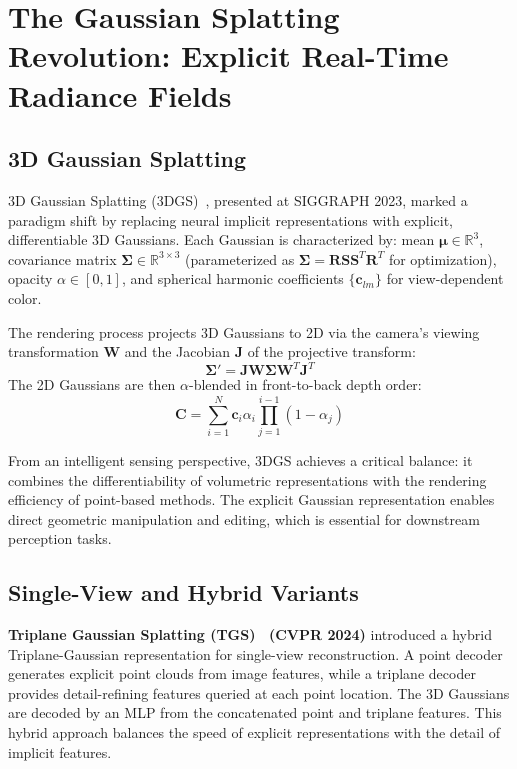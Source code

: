 \documentclass[journal]{IEEEtran}
\begin{document}
\section{The Gaussian Splatting Revolution: Explicit Real-Time Radiance Fields}
\label{sec:3dgs}

\subsection{3D Gaussian Splatting}

3D Gaussian Splatting (3DGS)~\cite{3dgs}, presented at SIGGRAPH 2023, marked a paradigm shift by replacing neural implicit representations with explicit, differentiable 3D Gaussians. Each Gaussian is characterized by: mean $\boldsymbol{\mu} \in \mathbb{R}^3$, covariance matrix $\boldsymbol{\Sigma} \in \mathbb{R}^{3\times 3}$ (parameterized as $\boldsymbol{\Sigma} = \mathbf{R}\mathbf{S}\mathbf{S}^T\mathbf{R}^T$ for optimization), opacity $\alpha \in [0,1]$, and spherical harmonic coefficients $\{\mathbf{c}_{lm}\}$ for view-dependent color.

The rendering process projects 3D Gaussians to 2D via the camera's viewing transformation $\mathbf{W}$ and the Jacobian $\mathbf{J}$ of the projective transform:
\begin{equation}
\boldsymbol{\Sigma}' = \mathbf{J}\mathbf{W}\boldsymbol{\Sigma}\mathbf{W}^T\mathbf{J}^T
\end{equation}
The 2D Gaussians are then $\alpha$-blended in front-to-back depth order:
\begin{equation}
\mathbf{C} = \sum_{i=1}^N \mathbf{c}_i \alpha_i \prod_{j=1}^{i-1} (1 - \alpha_j)
\end{equation}

From an intelligent sensing perspective, 3DGS achieves a critical balance: it combines the differentiability of volumetric representations with the rendering efficiency of point-based methods. The explicit Gaussian representation enables direct geometric manipulation and editing, which is essential for downstream perception tasks.

\subsection{Single-View and Hybrid Variants}

\textbf{Triplane Gaussian Splatting (TGS)~\cite{tgs} (CVPR 2024)} introduced a hybrid Triplane-Gaussian representation for single-view reconstruction. A point decoder generates explicit point clouds from image features, while a triplane decoder provides detail-refining features queried at each point location. The 3D Gaussians are decoded by an MLP from the concatenated point and triplane features. This hybrid approach balances the speed of explicit representations with the detail of implicit features.
\end{document}
